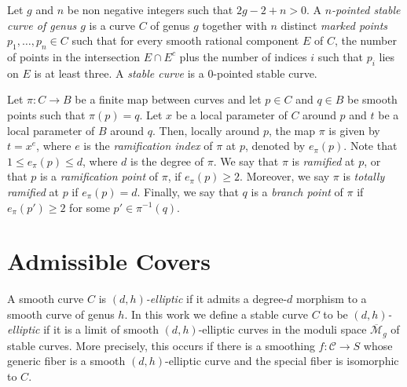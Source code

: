 \documentclass{article}
\renewcommand{\:}{\colon }
\begin{document}
Let  $g$ and $n$ be non negative integers such that $2g-2+n>0$. A \textit{$n$-pointed stable curve of genus $g$} is a curve $C$ of genus $g$ together with $n$ distinct \emph{marked points} $p_1,\ldots,p_n\in C$  such that for every  smooth rational component $E$ of $C$,  
 the number of points in the intersection   $E\cap E^{c}$ plus the number of indices $i$ such that  $p_i$ lies on $E$ is at least three. 
A \textit{stable curve} is a 0-pointed stable curve.

Let $\pi: C \rightarrow B$ be a finite map between curves and let $p \in C$ and $q \in B$ be  smooth points such that $\pi(p)=q$. Let $x$ be a local parameter of $C$ around $p$ and $t$ be a local parameter of $B$ around $q$. Then, locally around $p$, the map $\pi$ is given by $t=x^e$, where $e$ is the \textit{ramification index} of $\pi$ at $p$, denoted by $e_{\pi}(p)$. Note that $1\leq e_{\pi}(p)\leq d$, where $d$ is the degree of $\pi$. 
We say that $\pi$ is \textit{ramified} at $p$, or that $p$ is a \textit{ramification point} of $\pi$, if $e_{\pi}(p)\geq 2.$ 
Moreover, we say $\pi$ is \textit{totally ramified} at $p$ if $e_{\pi}(p)=d$.
Finally, we say that $q$ is a \emph{branch point} of $\pi$ if $e_\pi(p')\geq 2$ for some $p'\in\pi^{-1}(q)$.




\section{Admissible Covers}\label{sec:admissible}







A smooth curve $C$ 
is \emph{$(d, h)$-elliptic} if it admits a degree-$d$ morphism to a smooth curve of genus $h$. 
In this work we define a stable curve $C$ to be \emph{$(d, h)$-elliptic} if it is a limit of smooth $(d, h)$-elliptic curves in the moduli space $\overline{\mathcal M}_g$ of stable curves. More precisely, this occurs if there is a smoothing $f:\mathcal C \rightarrow S$ whose generic fiber is a smooth $(d, h)$-elliptic curve and the special fiber is isomorphic to $C$. 
\end{document}
